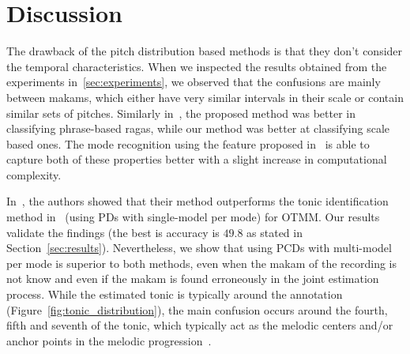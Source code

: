 \documentclass{sig-alternate}
\begin{document}


\section{Discussion}\label{sec:discussion}

The drawback of the pitch distribution based methods is that they don't consider the temporal characteristics. When we inspected the results obtained from the experiments in~\ref{sec:experiments}, we observed that the confusions are mainly between makams, which either have very similar intervals in their scale or contain similar sets of pitches. Similarly in~\cite{gulati_network}, the proposed method was better in classifying phrase-based ragas, while our method was better at classifying scale based ones. The mode recognition using the feature proposed in~\cite{gulati2016raga} is able to capture both of these properties better with a slight increase in computational complexity.

In~\cite{sercan_tonic}, the authors showed that their method outperforms the tonic identification method in~\cite{bozkurt_tonic} (using PDs with single-model per mode) for OTMM. Our results validate the findings (the best is accuracy is $49.8$ as stated in Section~\ref{sec:results}). Nevertheless, we show that using PCDs with multi-model per mode is superior to both methods, even when the makam of the recording is not know and even if the makam is found erroneously in the joint estimation process. While the estimated tonic is typically around the annotation (Figure~\ref{fig:tonic_distribution}), the main confusion occurs around the fourth, fifth and seventh of the tonic, which typically act as the melodic centers and/or anchor points in the melodic progression~\cite{ozkan1984musiki}.
\end{document}

